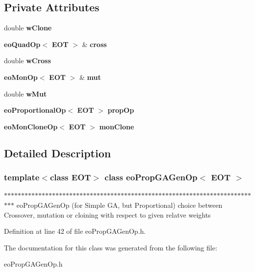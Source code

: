 \subsection*{Private Attributes}
\begin{CompactItemize}
\item 
double {\bf w\-Clone}\label{classeo_prop_g_a_gen_op_r0}

\item 
{\bf eo\-Quad\-Op}$<$ {\bf EOT} $>$ \& {\bf cross}\label{classeo_prop_g_a_gen_op_r1}

\item 
double {\bf w\-Cross}\label{classeo_prop_g_a_gen_op_r2}

\item 
{\bf eo\-Mon\-Op}$<$ {\bf EOT} $>$ \& {\bf mut}\label{classeo_prop_g_a_gen_op_r3}

\item 
double {\bf w\-Mut}\label{classeo_prop_g_a_gen_op_r4}

\item 
{\bf eo\-Proportional\-Op}$<$ {\bf EOT} $>$ {\bf prop\-Op}\label{classeo_prop_g_a_gen_op_r5}

\item 
{\bf eo\-Mon\-Clone\-Op}$<$ {\bf EOT} $>$ {\bf mon\-Clone}\label{classeo_prop_g_a_gen_op_r6}

\end{CompactItemize}


\subsection{Detailed Description}
\subsubsection*{template$<$class EOT$>$ class eo\-Prop\-GAGen\-Op$<$ EOT $>$}

$\ast$$\ast$$\ast$$\ast$$\ast$$\ast$$\ast$$\ast$$\ast$$\ast$$\ast$$\ast$$\ast$$\ast$$\ast$$\ast$$\ast$$\ast$$\ast$$\ast$$\ast$$\ast$$\ast$$\ast$$\ast$$\ast$$\ast$$\ast$$\ast$$\ast$$\ast$$\ast$$\ast$$\ast$$\ast$$\ast$$\ast$$\ast$$\ast$$\ast$$\ast$$\ast$$\ast$$\ast$$\ast$$\ast$$\ast$$\ast$$\ast$$\ast$$\ast$$\ast$$\ast$$\ast$$\ast$$\ast$$\ast$$\ast$$\ast$$\ast$$\ast$$\ast$$\ast$$\ast$$\ast$$\ast$$\ast$$\ast$$\ast$$\ast$$\ast$$\ast$$\ast$$\ast$$\ast$ eo\-Prop\-GAGen\-Op (for Simple GA, but Proportional) choice between Crossover, mutation or cloining with respect to given relatve weights 



Definition at line 42 of file eo\-Prop\-GAGen\-Op.h.

The documentation for this class was generated from the following file:\begin{CompactItemize}
\item 
eo\-Prop\-GAGen\-Op.h\end{CompactItemize}
